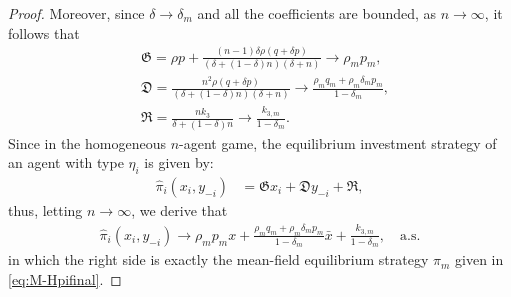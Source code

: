 \documentclass[11pt]{article}
\newenvironment{bluepar}
{\begingroup\color{blue}}
{\endgroup}
\numberwithin{equation}{section}
\providecommand{\smn}{{-}} %
\begin{document}
\begin{bluepar}
\begin{proof}
Moreover, since $\delta\to\delta_{\scriptscriptstyle m}$ and all the coefficients are bounded, as $n \to \infty$, it follows that
	\begin{align*}
		&	\mathfrak{G} = \rho p + \frac{(n-1)\delta\rho (q + \delta p)}{(\delta+(1-\delta)n)(\delta+n)}\rightarrow \rho_{\scriptscriptstyle m} p_{\scriptscriptstyle m}, \\
		& \mathfrak{D}=\frac{n^2 \rho (q + \delta p)}{(\delta+(1-\delta)n)(\delta+n)}\rightarrow \frac{\rho_{\scriptscriptstyle m} q_{\scriptscriptstyle m}+\rho_{\scriptscriptstyle m} \delta_{\scriptscriptstyle m} p_{\scriptscriptstyle m}}{1-\delta_{\scriptscriptstyle m}}, \\
		&\mathfrak{R} = \frac{nk_3}{\delta + (1 - \delta)n}\rightarrow \frac{k_{3,m}}{1-\delta_{\scriptscriptstyle m}}.
	\end{align*}
Since in the homogeneous $n$-agent game, the equilibrium investment strategy of an agent with type $\eta_i$ is given by:
	\begin{align}
		\widehat{\pi}_i(x_i, y_{-i}) & = \mathfrak{G} x_i+\mathfrak{D} y_{\smn i}+\mathfrak{R},
	\end{align}
thus, letting $n\to\infty$, we derive that
	\begin{align*}
\widehat{\pi}_i(x_i, y_{-i}) \to \rho_{\scriptscriptstyle m}p_{\scriptscriptstyle m} x+\frac{\rho_{\scriptscriptstyle m} q_{\scriptscriptstyle m}+\rho_{\scriptscriptstyle m} \delta_{\scriptscriptstyle m} p_{\scriptscriptstyle m}}{1-\delta_{\scriptscriptstyle m}}\bar{x}+\frac{k_{3,m}}{1-\delta_{\scriptscriptstyle m}},\quad \text{a.s.}
	\end{align*}
in which the right side is exactly the mean-field equilibrium strategy $\widehat{\pi}_{\scriptscriptstyle m}$ given in \eqref{eq:M-Hpifinal}.
\end{proof}
\end{bluepar}
\end{document}
